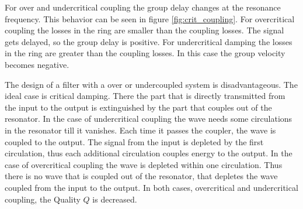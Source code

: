 For over and undercritical coupling the group delay changes at the resonance frequency. This behavior can be seen in figure \ref{fig:crit_coupling}. For overcritical coupling the losses in the ring are smaller than the coupling losses. The signal gets delayed, so the group delay is positive. For undercritical damping the losses in the ring are greater than the coupling losses. In this case the group velocity becomes negative.

The design of a filter with a over or undercoupled system is disadvantageous. The ideal case is critical damping. There the part that is directly transmitted from the input to the output is extinguished by the part that couples out of the resonator. In the case of undercritical coupling the wave needs some circulations in the resonator till it vanishes. Each time it passes the coupler, the wave is coupled to the output. The signal from the input is depleted by the first circulation, thus each additional circulation couples energy to the output.
In the case of overcritical coupling the wave is depleted within one circulation. Thus there is no wave that is coupled out of the resonator, that depletes the wave coupled from the input to the output.
In both cases, overcritical and undercritical coupling, the Quality $Q$ is decreased.
